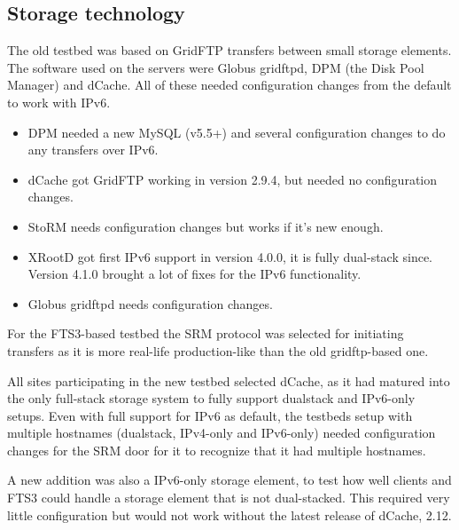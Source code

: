 \subsection{Storage technology}

The old testbed was based on GridFTP\cite{GFTP1.0}\cite{GFTP2.0} transfers between small storage elements. The software used on the servers were Globus gridftpd, 
DPM (the Disk Pool Manager) and dCache. 
All of these needed configuration changes from the default to work with IPv6.

\begin{itemize}
\item DPM needed a new MySQL (v5.5+) and several configuration changes to do any transfers over IPv6.
\item dCache got GridFTP working in version 2.9.4, but needed no configuration changes.
\item StoRM needs configuration changes but works if it's new enough.
\item XRootD got first IPv6 support in version 4.0.0, it is fully dual-stack since. Version 4.1.0 brought a lot of fixes for the IPv6 functionality.
\item Globus gridftpd needs configuration changes.
\end{itemize}

For the FTS3-based testbed the SRM protocol \cite{SRM2.2} was selected for initiating transfers as it is more real-life production-like 
than the old gridftp-based one. 

All sites participating in the new testbed selected dCache, as it had matured into the only full-stack storage 
system to fully support dualstack and IPv6-only setups. Even with full support for IPv6 as default, the testbeds setup with 
multiple hostnames (dualstack, IPv4-only and IPv6-only) needed configuration changes for the SRM door for it to recognize that it had multiple hostnames.

A new addition was also a IPv6-only storage element, to test how well clients and FTS3 could handle a storage element that is not dual-stacked.
This required very little configuration but would not work without the latest release of dCache, 2.12.



